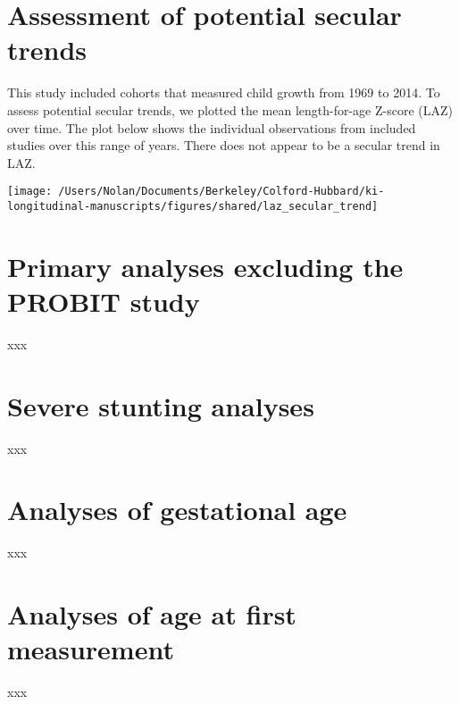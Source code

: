 \documentclass[9pt,]{book}
\begin{document}
\chapter{Assessment of potential secular trends}\label{secular-trends}

\raggedright

This study included cohorts that measured child growth from 1969 to
2014. To assess potential secular trends, we plotted the mean
length-for-age Z-score (LAZ) over time. The plot below shows the
individual observations from included studies over this range of years.
There does not appear to be a secular trend in LAZ.

\texttt{[image: /Users/Nolan/Documents/Berkeley/Colford-Hubbard/ki-longitudinal-manuscripts/figures/shared/laz\_secular\_trend]}

\chapter{Primary analyses excluding the PROBIT
study}\label{exclude-PROBIT}

\raggedright

xxx

\chapter{Severe stunting analyses}\label{severe-stunting}

\raggedright

xxx

\chapter{Analyses of gestational age}\label{gestational}

\raggedright

xxx

\chapter{Analyses of age at first measurement}\label{age-meas}

\raggedright

xxx


\end{document}
